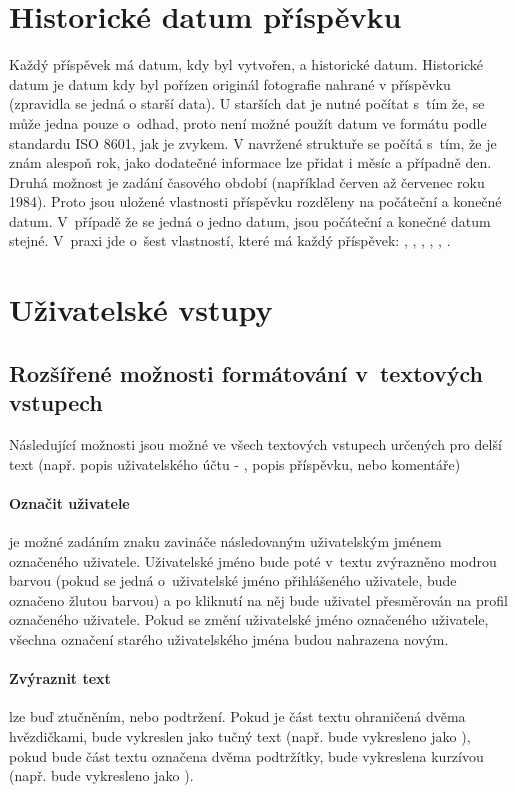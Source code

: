 \documentclass[12pt, a4paper,
  oneside,      %
]{report}
\begin{document}
\section{Historické datum příspěvku}\label{section:historical_date}
Každý příspěvek má datum, kdy byl vytvořen, a historické datum. Historické datum je datum kdy byl pořízen originál fotografie nahrané v příspěvku (zpravidla se jedná o starší data). U starších dat je nutné počítat s~tím že, se může jedna pouze o~odhad, proto není možné použít datum ve formátu podle standardu ISO 8601, jak je zvykem. V navržené struktuře se počítá s~tím, že je znám alespoň rok, jako dodatečné informace lze přidat i měsíc a případně den. Druhá možnost je zadání časového období (například červen až červenec roku 1984). Proto jsou uložené vlastnosti příspěvku rozděleny na počáteční a konečné datum. V~případě že se jedná o jedno datum, jsou počáteční a konečné datum stejné. V~praxi jde o~šest vlastností, které má každý příspěvek: , , , , , .

\section{Uživatelské vstupy}
\subsection{Rozšířené možnosti formátování v~textových vstupech}
Následující možnosti jsou možné ve všech textových vstupech určených pro delší text (např. popis uživatelského účtu - , popis příspěvku, nebo komentáře)
\paragraph{Označit uživatele} je možné zadáním znaku zavináče následovaným uživatelským jménem označeného uživatele. Uživatelské jméno bude poté v~textu zvýrazněno modrou barvou (pokud se jedná o~uživatelské jméno přihlášeného uživatele, bude označeno žlutou barvou) a po kliknutí na něj bude uživatel přesměrován na profil označeného uživatele. Pokud se změní uživatelské jméno označeného uživatele, všechna označení starého uživatelského jména budou nahrazena novým.
\paragraph{Zvýraznit text} lze buď ztučněním, nebo podtržení. Pokud je část textu ohraničená dvěma hvězdičkami, bude vykreslen jako tučný text (např.  bude vykresleno jako ), pokud bude část textu označena dvěma podtržítky, bude vykreslena kurzívou (např.  bude vykresleno jako ).
\end{document}
